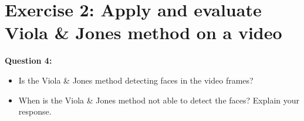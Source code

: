 \section{Exercise 2: Apply and evaluate Viola \& Jones method on a video}

{\bfseries
Question 4:
\begin{itemize}
\item Is the Viola \& Jones method detecting faces in the video frames?
\item When is the Viola \& Jones method not able to detect the faces? Explain
			your response.
\end{itemize}
}